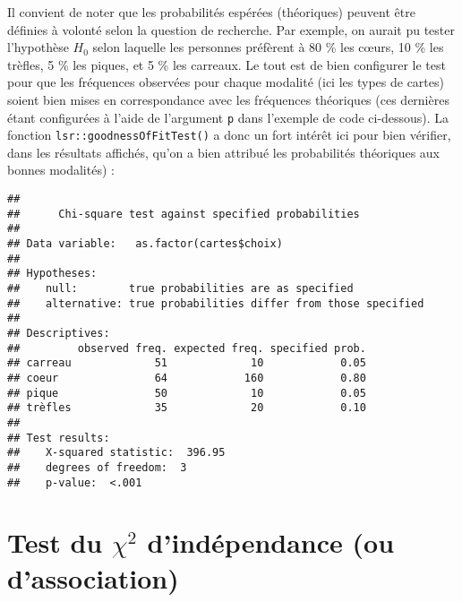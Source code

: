 \documentclass[
  french,
]{book}
\newenvironment{Shaded}{\begin{snugshade}}{\end{snugshade}}
\newcommand{\DataTypeTok}[1]{\textcolor[rgb]{0.13,0.29,0.53}{#1}}
\newcommand{\FloatTok}[1]{\textcolor[rgb]{0.00,0.00,0.81}{#1}}
\newcommand{\KeywordTok}[1]{\textcolor[rgb]{0.13,0.29,0.53}{\textbf{#1}}}
\newcommand{\NormalTok}[1]{#1}
\newcommand{\OperatorTok}[1]{\textcolor[rgb]{0.81,0.36,0.00}{\textbf{#1}}}
\begin{document}
Il convient de noter que les probabilités espérées (théoriques) peuvent être définies à volonté selon la question de recherche. Par exemple, on aurait pu tester l'hypothèse \(H_{0}\) selon laquelle les personnes préfèrent à 80 \% les cœurs, 10 \% les trèfles, 5 \% les piques, et 5 \% les carreaux. Le tout est de bien configurer le test pour que les fréquences observées pour chaque modalité (ici les types de cartes) soient bien mises en correspondance avec les fréquences théoriques (ces dernières étant configurées à l'aide de l'argument \texttt{p} dans l'exemple de code ci-dessous). La fonction \texttt{lsr::goodnessOfFitTest()} a donc un fort intérêt ici pour bien vérifier, dans les résultats affichés, qu'on a bien attribué les probabilités théoriques aux bonnes modalités) :

\begin{Shaded}
\end{Shaded}

\begin{verbatim}
## 
##      Chi-square test against specified probabilities
## 
## Data variable:   as.factor(cartes$choix) 
## 
## Hypotheses: 
##    null:        true probabilities are as specified
##    alternative: true probabilities differ from those specified
## 
## Descriptives: 
##         observed freq. expected freq. specified prob.
## carreau             51             10            0.05
## coeur               64            160            0.80
## pique               50             10            0.05
## trèfles             35             20            0.10
## 
## Test results: 
##    X-squared statistic:  396.95 
##    degrees of freedom:  3 
##    p-value:  <.001
\end{verbatim}

\hypertarget{test-du-chi2-dinduxe9pendance-ou-dassociation}{%
\section{\texorpdfstring{Test du \(\chi^2\) d'indépendance (ou d'association)}{Test du \textbackslash chi\^{}2 d'indépendance (ou d'association)}}\label{test-du-chi2-dinduxe9pendance-ou-dassociation}}
\end{document}
